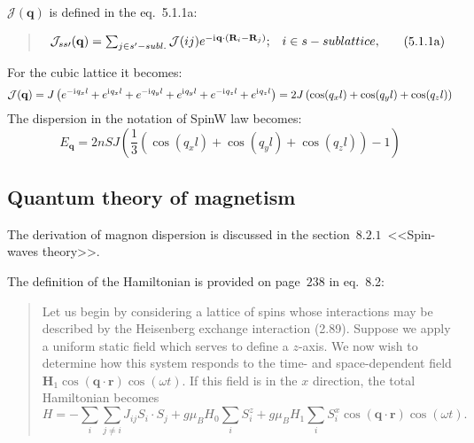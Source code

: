     $\mathcal{J}(\mathbf{q})$ is defined in the eq.~5.1.1a:
    \begin{quote}
        \begin{equation}
            \begin{matrix}
                \mathcal{J}_{ss\prime}(\mathbf{q}) = \sum_{j \in s^{\prime} - subl.} \mathcal{J}(ij)e^{-\mathrm{i}\mkern1mu\mathbf{q}\cdot(\mathbf{R}_i - \mathbf{R}_j)}; & i \in s-sublattice,
            \end{matrix}  
            \label{eq:rem-5.1.1a} \tag{5.1.1a}
        \end{equation}
    \end{quote}
    For the cubic lattice it becomes:
    \begin{equation}
        \mathcal{J}(\mathbf{q}) = J \left(e^{-\mathrm{i}\mkern1mu q_xl} + e^{\mathrm{i}\mkern1mu q_xl} + e^{-\mathrm{i}\mkern1mu q_yl} + e^{\mathrm{i}\mkern1mu q_yl} + e^{-\mathrm{i}\mkern1mu q_zl} + e^{\mathrm{i}\mkern1mu q_zl}\right) = 
        2J \left(\cos(q_xl) + \cos(q_yl) + \cos(q_zl)\right)
    \end{equation}
    The dispersion in the notation of SpinW law becomes:
    \begin{equation}
        E_{\mathbf{q}} = 2nSJ\left(\dfrac{1}{3}\left(\cos(q_xl) + \cos(q_yl) + \cos(q_zl)\right) - 1\right)
    \end{equation}
\subsection{Quantum theory of magnetism \cite{white1983quantum}}
    The derivation of magnon dispersion is discussed in the section~$8.2.1$~<<Spin-waves theory>>.

    The definition of the Hamiltonian is provided on page~$238$ in eq.~8.2:

    \begin{quote}
        Let us begin by considering a lattice of spins whose interactions may be described by the Heisenberg exchange interaction (2.89). 
        Suppose we apply a uniform static field which serves to define a $z$-axis. We now wish to determine how
        this system responds to the time- and space-dependent field 
        $\boldsymbol{H}_1\cos(\boldsymbol{q}\cdot\boldsymbol{r})\cos(\omega t)$. 
        If this field is in the $x$ direction, the total Hamiltonian becomes
        \begin{equation}
            H = -\sum_i\sum_{j\ne i} J_{ij}S_i\cdot S_{j} + g \mu_B H_0\sum_i S_i^z + g\mu_B H_1 \sum_i S_i^x\cos(\boldsymbol{q}\cdot\boldsymbol{r})\cos(\omega t).\label{eq:qtom-8.2} \tag{8.2}
        \end{equation}
    \end{quote}
    
